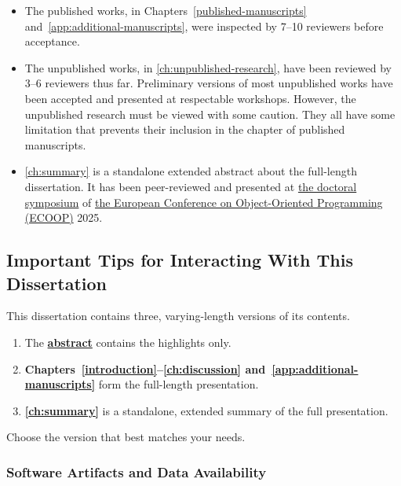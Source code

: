 \begin{itemize}

\item The published works, in Chapters~\ref{published-manuscripts} and~\ref{app:additional-manuscripts}, were inspected by 7--10 reviewers before acceptance.

\item The unpublished works, in \autoref{ch:unpublished-research}, have been reviewed by 3--6 reviewers thus far.
Preliminary versions of most unpublished works have been accepted and presented at respectable workshops.
However, the unpublished research must be viewed with some caution.
They all have some limitation that prevents their inclusion in the chapter of published manuscripts.

\item \autoref{ch:summary} is a standalone extended abstract about the full-length dissertation.
It has been peer-reviewed and presented at \href{https://2025.ecoop.org/track/ecoop-2025-doctoral-symposium}{the doctoral symposium} of \href{https://2025.ecoop.org}{the European Conference on Object-Oriented Programming (ECOOP)} 2025.

\end{itemize}

\subsection{Important Tips for Interacting With This Dissertation}
\label{subsec:tips}

This dissertation contains three, varying-length versions of its contents.

\begin{infobox}
\begin{enumerate}[wide, labelwidth=!, labelindent=0pt]
\item The \textbf{\hyperref[abs]{abstract}} contains the highlights only.
\item \textbf{Chapters~\ref{introduction}--\ref{ch:discussion} and~\ref{app:additional-manuscripts}} form the full-length presentation.
\item \textbf{\autoref{ch:summary}} is a standalone, extended summary of the full presentation.
\end{enumerate}
\end{infobox}

Choose the version that best matches your needs.

\subsubsection{Software Artifacts and Data Availability}

